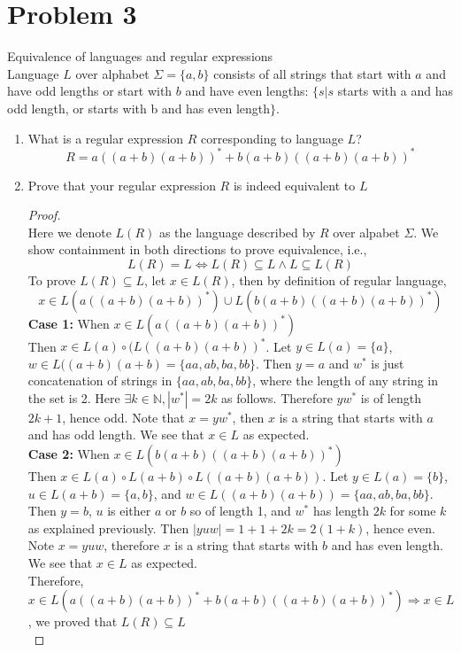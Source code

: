 \documentclass[11pt]{article}
\theoremstyle{plain}%
\theoremstyle{definition}
\theoremstyle{remark}
\newcommand{\N}{\mathbb{N}}
\begin{document}
\section*{Problem 3}

Equivalence of languages and regular expressions \\
Language $L$ over alphabet $\Sigma=\{a,b\}$ consists of all strings that start with $a$ and have odd lengths or start with $b$ and have even lengths: $\{s | s$ starts with a and has odd length, or starts with b and has even length$\}$.
\begin{enumerate}
\item What is a regular expression $R$ corresponding to language $L$?
\[
  R = a((a+b)(a+b))^* + b(a+b)((a+b)(a+b))^*
\]
\item Prove that your regular expression $R$ is indeed equivalent to $L$

\begin{proof}
  $ $\\
  Here we denote $L(R)$ as the language described by $R$ over alpabet $\Sigma$. We show containment in both directions to prove equivalence, i.e.,
  \[
    L(R) = L \iff L(R)\subseteq L \land L\subseteq L(R)
  \]
  To prove $L(R)\subseteq L$, let $x\in L(R)$, then by definition of regular language,
  \[
    x\in L(a((a+b)(a+b))^*) \cup L(b(a+b)((a+b)(a+b))^*)
  \]
  \textbf{Case 1:} When $x\in L(a((a+b)(a+b))^*)$\\
  Then $x \in L(a)\circ (L((a+b)(a+b))^*$. Let $y\in L(a) = \{ a\}$, $w\in L((a+b)(a+b) = \{ aa, ab, ba, bb\}$. Then $y=a$ and $w^*$ is just concatenation of strings in $\{ aa, ab, ba, bb\}$, where the length of any string in the set is 2. Here $\exists k\in \N, | w^* | = 2k$ as follows. Therefore $yw^*$ is of length $2k+1$, hence odd. Note that $x=yw^*$, then $x$ is a string that starts with $a$ and has odd length. We see that $x\in L$ as expected.\\
  \textbf{Case 2:} When $x\in L(b(a+b)((a+b)(a+b))^*)$\\
  Then $x\in L(a)\circ L(a+b)\circ L((a+b)(a+b))$. Let $y\in L(a) = \{ b\}$, $u\in L(a+b) = \{ a, b\}$, and $w\in L((a+b)(a+b)) = \{ aa, ab, ba, bb\}$. Then $y=b$, $u$ is either $a$ or $b$ so of length 1, and $w^*$ has length $2k$ for some $k$ as explained previously. Then $|yuw| = 1+1+2k = 2(1+k)$, hence even. Note $x=yuw$, therefore $x$ is a string that starts with $b$ and has even length. We see that $x\in L$ as expected. \\
  Therefore, $x\in L(a((a+b)(a+b))^* + b(a+b)((a+b)(a+b))^*) \Rightarrow x\in L$, we proved that $L(R)\subseteq L$ \\


\end{proof}
\end{enumerate}
\end{document}
